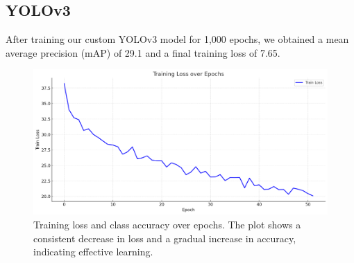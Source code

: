 \documentclass{article}
\begin{document}
\subsection{YOLOv3}
After training our custom YOLOv3 model for 1,000 epochs, we obtained a mean average precision (mAP) of 29.1 and a final training loss of 7.65.

\begin{figure}[h!]
  \centering
  \includegraphics[width=\linewidth]{training_loss.png}
  \caption{Training loss and class accuracy over epochs. The plot shows a consistent decrease in loss and a gradual increase in accuracy, indicating effective learning.}
  \label{fig:training_loss}
\end{figure}
\end{document}
